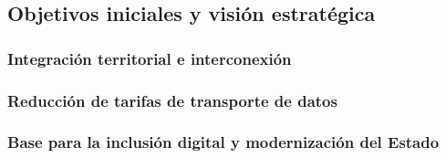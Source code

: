 \subsection{Objetivos iniciales y visión estratégica}
\subsubsection{Integración territorial e interconexión}
\subsubsection{Reducción de tarifas de transporte de datos}
\subsubsection{Base para la inclusión digital y modernización del Estado}
